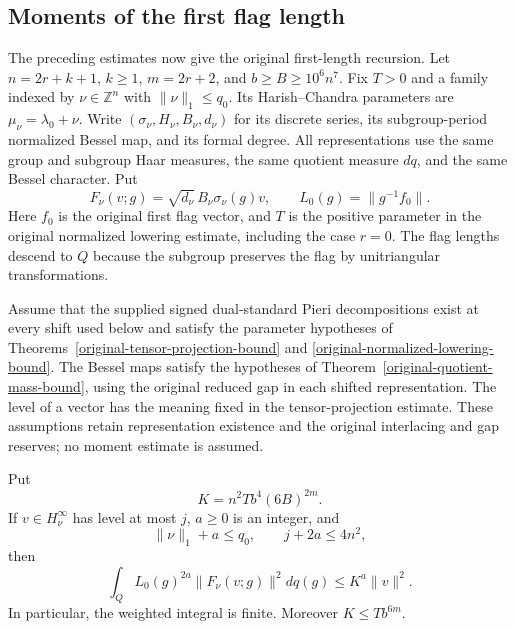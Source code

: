 \subsection{Moments of the first flag length}
\label{archimedean-first-length}

The preceding estimates now give the original first-length recursion.
Let $n=2r+k+1$, $k\ge1$, $m=2r+2$, and
$b\ge B\ge10^6n^7$.  Fix $T>0$ and a family indexed by
$\nu\in\mathbb Z^n$ with $\|\nu\|_1\le q_0$.  Its Harish--Chandra
parameters are $\mu_\nu=\lambda_0+\nu$.  Write
$(\sigma_\nu,H_\nu,B_\nu,d_\nu)$ for its discrete series, its
subgroup-period normalized Bessel map, and its formal degree.
All representations use the same group and subgroup Haar measures,
the same quotient measure $dq$, and the same Bessel character.
Put
\[
       F_\nu(v;g)=\sqrt{d_\nu}\,B_\nu\sigma_\nu(g)v,
       \qquad L_0(g)=\|g^{-1}f_0\|.
\]
Here $f_0$ is the original first flag vector, and $T$ is the positive
parameter in the original normalized lowering estimate, including
the case $r=0$.  The flag lengths descend to $Q$ because the
subgroup preserves the flag by unitriangular transformations.

Assume that the supplied signed dual-standard Pieri decompositions
exist at every shift used below and satisfy the parameter hypotheses
of Theorems~\ref{original-tensor-projection-bound} and
\ref{original-normalized-lowering-bound}.  The Bessel maps satisfy
the hypotheses of Theorem~\ref{original-quotient-mass-bound}, using
the original reduced gap in each shifted representation.
The level of a vector has the meaning fixed in the tensor-projection
estimate.  These assumptions retain representation existence and the
original interlacing and gap reserves; no moment estimate is assumed.

\begin{theorem}\label{original-first-length-moment-bound}
Put
\[
                 K=n^2T b^4(6B)^{2m}.
\]
If $v\in H_\nu^\infty$ has level at most $j$, $a\ge0$ is an
integer, and
\begin{equation}\label{first-length-reserve}
          \|\nu\|_1+a\le q_0,\qquad j+2a\le4n^2,
\end{equation}
then
\begin{equation}\label{first-length-moment-result}
       \int_Q L_0(g)^{2a}\|F_\nu(v;g)\|^2dq(g)
                            \le K^a\|v\|^2.
\end{equation}
In particular, the weighted integral is finite.  Moreover
$K\le T b^{6m}$.
\end{theorem}

